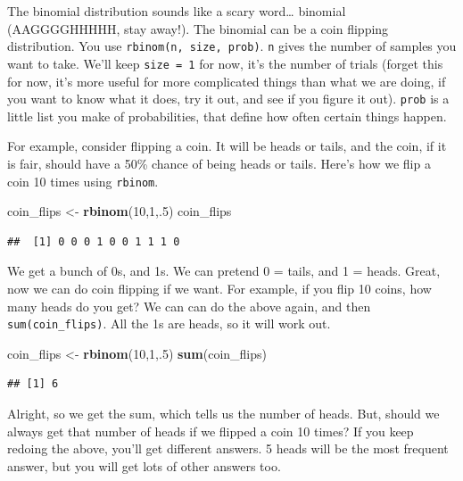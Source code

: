 \documentclass[]{book}
\newenvironment{Shaded}{\begin{snugshade}}{\end{snugshade}}
\newcommand{\KeywordTok}[1]{\textcolor[rgb]{0.13,0.29,0.53}{\textbf{{#1}}}}
\newcommand{\DecValTok}[1]{\textcolor[rgb]{0.00,0.00,0.81}{{#1}}}
\newcommand{\StringTok}[1]{\textcolor[rgb]{0.31,0.60,0.02}{{#1}}}
\newcommand{\NormalTok}[1]{{#1}}
\theoremstyle{definition}
\theoremstyle{definition}
\theoremstyle{definition}
\theoremstyle{remark}
\begin{document}
The binomial distribution sounds like a scary word\ldots{} binomial
(AAGGGGHHHHH, stay away!). The binomial can be a coin flipping
distribution. You use \texttt{rbinom(n,\ size,\ prob)}. \texttt{n} gives
the number of samples you want to take. We'll keep \texttt{size\ =\ 1}
for now, it's the number of trials (forget this for now, it's more
useful for more complicated things than what we are doing, if you want
to know what it does, try it out, and see if you figure it out).
\texttt{prob} is a little list you make of probabilities, that define
how often certain things happen.

For example, consider flipping a coin. It will be heads or tails, and
the coin, if it is fair, should have a 50\% chance of being heads or
tails. Here's how we flip a coin 10 times using \texttt{rbinom}.

\begin{Shaded}
\begin{Highlighting}[]
\NormalTok{coin_flips <-}\StringTok{ }\KeywordTok{rbinom}\NormalTok{(}\DecValTok{10}\NormalTok{,}\DecValTok{1}\NormalTok{,.}\DecValTok{5}\NormalTok{)}
\NormalTok{coin_flips}
\end{Highlighting}
\end{Shaded}

\begin{verbatim}
##  [1] 0 0 0 1 0 0 1 1 1 0
\end{verbatim}

We get a bunch of 0s, and 1s. We can pretend 0 = tails, and 1 = heads.
Great, now we can do coin flipping if we want. For example, if you flip
10 coins, how many heads do you get? We can can do the above again, and
then \texttt{sum(coin\_flips)}. All the 1s are heads, so it will work
out.

\begin{Shaded}
\begin{Highlighting}[]
\NormalTok{coin_flips <-}\StringTok{ }\KeywordTok{rbinom}\NormalTok{(}\DecValTok{10}\NormalTok{,}\DecValTok{1}\NormalTok{,.}\DecValTok{5}\NormalTok{)}
\KeywordTok{sum}\NormalTok{(coin_flips)}
\end{Highlighting}
\end{Shaded}

\begin{verbatim}
## [1] 6
\end{verbatim}

Alright, so we get the sum, which tells us the number of heads. But,
should we always get that number of heads if we flipped a coin 10 times?
If you keep redoing the above, you'll get different answers. 5 heads
will be the most frequent answer, but you will get lots of other answers
too.
\end{document}
